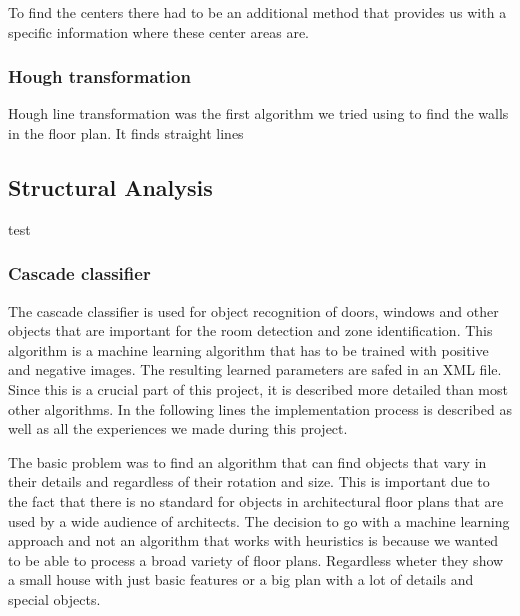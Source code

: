 To find the centers there had to be an additional method that provides us with a specific information where these center areas are.
  
\subsubsection{Hough transformation}
Hough line transformation was the first algorithm we tried using to find the walls in the floor plan. It finds straight lines  

\subsection{Structural Analysis}
test
\subsubsection{Cascade classifier}
The cascade classifier is used for object recognition of doors, windows and other objects that are important for the room detection and zone identification. This algorithm is a machine learning algorithm that has to be trained with positive and negative images. The resulting learned parameters are safed in an XML file. Since this is a crucial part of this project, it is described more detailed than most other algorithms. In the following lines the implementation process is described as well as all the experiences we made during this project.

The basic problem was to find an algorithm that can find objects that vary in their details and regardless of their rotation and size. This is important due to the fact that there is no standard for objects in architectural floor plans that are used by a wide audience of architects. The decision to go with a machine learning approach and not an algorithm that works with heuristics is because we wanted to be able to process a broad variety of floor plans. Regardless wheter they show a small house with just basic features or a big plan with a lot of details and special objects.






